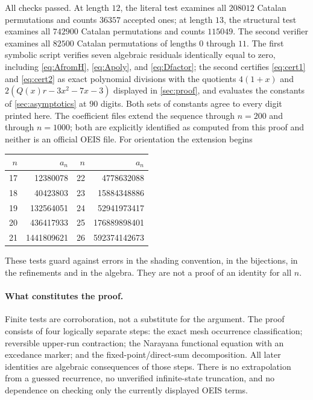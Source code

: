 \documentclass[11pt,letterpaper]{article}
\numberwithin{equation}{section}
\theoremstyle{definition}
\begin{document}
All checks passed. At length $12$, the literal test examines all
$208012$ Catalan permutations and counts $36357$ accepted ones; at
length $13$, the structural test examines all $742900$ Catalan
permutations and counts $115049$. The second verifier examines all
$82500$ Catalan permutations of lengths $0$ through $11$.
The first symbolic script verifies seven algebraic residuals identically
equal to zero, including \eqref{eq:AfromH}, \eqref{eq:Apoly}, and
\eqref{eq:Dfactor}; the second certifies \eqref{eq:cert1} and
\eqref{eq:cert2} as exact polynomial divisions with the quotients
$4(1+x)$ and $2(Q(x)r-3x^2-7x-3)$ displayed in \cref{sec:proof}, and
evaluates the constants of \cref{sec:asymptotics} at $90$ digits.
Both sets of constants agree to every digit printed here.
The coefficient files extend the sequence through $n=200$ and through
$n=1000$; both are explicitly identified as computed from this proof and
neither is an official OEIS file. For orientation the extension begins
\begin{center}
\begin{tabular}{r r@{\qquad}r r}
\toprule
$n$ & $a_n$ & $n$ & $a_n$\\
\midrule
17 & 12380078 & 22 & 4778632088\\
18 & 40423803 & 23 & 15884348886\\
19 & 132564051 & 24 & 52941973417\\
20 & 436417933 & 25 & 176889898401\\
21 & 1441809621 & 26 & 592374142673\\
\bottomrule
\end{tabular}
\end{center}
These tests guard against errors in the shading convention, in the
bijections, in the refinements and in the algebra. They are not a proof
of an identity for all $n$.

\paragraph{What constitutes the proof.}
Finite tests are corroboration, not a substitute for the argument.
The proof consists of four logically separate steps: the exact mesh
occurrence classification; reversible upper-run contraction; the
Narayana functional equation with an excedance marker; and the
fixed-point/direct-sum decomposition. All later identities are algebraic
consequences of those steps. There is no extrapolation from a guessed
recurrence, no unverified infinite-state truncation, and no dependence
on checking only the currently displayed OEIS terms.
\end{document}
